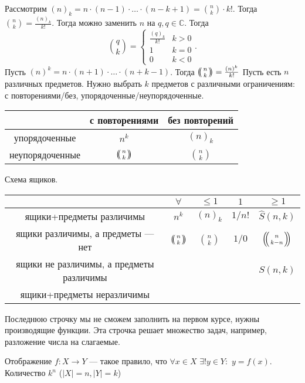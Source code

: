 Рассмотрим $(n)_k = n \cdot (n-1) \cdot \ldots \cdot (n-k+1) = \binom{n}{k} \cdot k!$. Тогда $\binom{n}{k} = \frac{(n)_k}{k!}$. Тогда можно заменить  $n$ на  $q, q \in \mathbb{C}$. Тогда  \[
    \binom{q}{k} = \begin{cases} \frac{(q)_k}{k!} & k > 0 \\ 1 & k = 0 \\ 0 & k < 0 \end{cases}
.\]
Пусть $(n)^k = n \cdot (n+1) \cdot \ldots \cdot (n+k-1)$. Тогда $\multiset{n}{k} = \frac{(n)^k}{k!}$
Пусть есть $n$ различных предметов. Нужно выбрать $k$ предметов с различными ограничениям: с повторениями/без, упорядоченные/неупорядоченные. 
\begin{center}
    \begin{tabular}{|c|c|c|}
        \hline
        & с повторениями & без повторений \\ \hline
        упорядоченные & $n^k$ &  $(n)_k$ \\ \hline
        неупорядоченные &  $\multiset{n}{k}$ &  $\binom{n}{k}$\\
        \hline
    \end{tabular}
\end{center}
Схема ящиков. 

\begin{center}
    \begin{tabular}{|c|c|c|c|c|}
        \hline
        & $\forall$ & $\le 1$ & $1$ &  $\ge 1$\\ \hline
        ящики+предметы различимы & $n^k$ & $(n)_k$ & $1 / n!$ & $\widehat{S}(n, k)$ \\ \hline
        ящики различимы, а предметы --- нет & $\multiset{n}{k}$ & $\binom{n}{k}$ & $1 / 0$ & $\multiset{n}{k-n}$\\ \hline
        ящики не различимы, а предметы различимы & & & & $S(n, k)$ \\ \hline
        ящики+предметы неразличимы & & & & \\ \hline
    \end{tabular}
\end{center}
Последнюю строчку мы не сможем заполнить на первом курсе, нужны производящие функции. Эта строчка решает множество задач, например, разложение числа на слагаемые.

Отображение $f: X \to Y$ --- такое правило, что $\forall x \in X$  $\exists! y \in Y:$  $y = f(x)$. Количество $k^n$ ($|X| = n, |Y| = k$)

